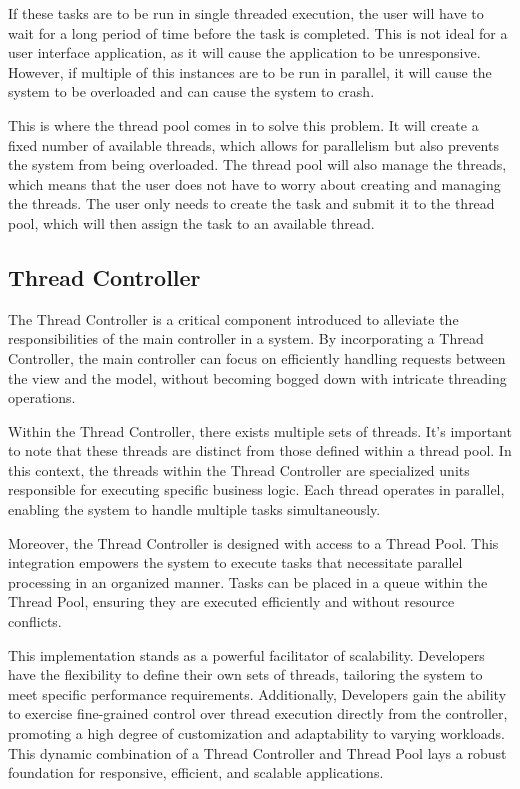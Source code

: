 If these tasks are to be run in single threaded execution, the user will have to wait for a long period of time before the task is completed. This is not ideal for a user interface application, as it will cause the application to be unresponsive. However, if multiple of this instances are to be run in parallel, it will cause the system to be overloaded and can cause the system to crash.

This is where the thread pool comes in to solve this problem. It will create a fixed number of available threads, which allows for parallelism but also prevents the system from being overloaded. The thread pool will also manage the threads, which means that the user does not have to worry about creating and managing the threads. The user only needs to create the task and submit it to the thread pool, which will then assign the task to an available thread.

\subsection{Thread Controller}
\label{subsec:thread-controller}

The Thread Controller is a critical component introduced to alleviate the responsibilities of the main controller in a system. By incorporating a Thread Controller, the main controller can focus on efficiently handling requests between the view and the model, without becoming bogged down with intricate threading operations.

Within the Thread Controller, there exists multiple sets of threads. It's important to note that these threads are distinct from those defined within a thread pool. In this context, the threads within the Thread Controller are specialized units responsible for executing specific business logic. Each thread operates in parallel, enabling the system to handle multiple tasks simultaneously.

Moreover, the Thread Controller is designed with access to a Thread Pool. This integration empowers the system to execute tasks that necessitate parallel processing in an organized manner. Tasks can be placed in a queue within the Thread Pool, ensuring they are executed efficiently and without resource conflicts.

This implementation stands as a powerful facilitator of scalability. Developers have the flexibility to define their own sets of threads, tailoring the system to meet specific performance requirements. Additionally, Developers gain the ability to exercise fine-grained control over thread execution directly from the controller, promoting a high degree of customization and adaptability to varying workloads. This dynamic combination of a Thread Controller and Thread Pool lays a robust foundation for responsive, efficient, and scalable applications.


